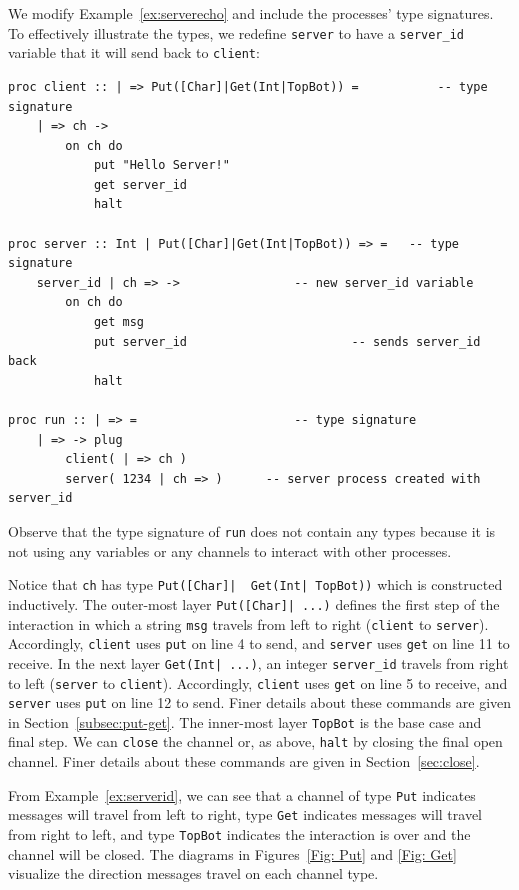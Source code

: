 \documentclass[11pt]{article}
\begin{document}
We modify Example~\ref{ex:serverecho} and include the processes' type signatures.
To effectively illustrate the types, we redefine \lstinline$server$ to have a \lstinline$server_id$ variable that it will send back to  \lstinline$client$:

\begin{lstlisting}[label=ex:serverid, caption=Server replies to Client with server id] 
proc client :: | => Put([Char]|Get(Int|TopBot)) = 			-- type signature
	| => ch ->
		on ch do 
			put "Hello Server!"	
			get server_id					
			halt

proc server :: Int | Put([Char]|Get(Int|TopBot)) => = 	-- type signature
	server_id | ch => ->				-- new server_id variable
		on ch do
			get msg							
			put server_id						-- sends server_id back
			halt
			
proc run :: | => = 						-- type signature
 	| => -> plug					
 		client( | => ch )		
 		server( 1234 | ch => )		-- server process created with server_id
\end{lstlisting}
Observe that the type signature of \lstinline$run$ does not contain any types because it is not using any variables or any channels to interact with other processes.

Notice that \lstinline$ch$ has type \lstinline$Put([Char]|  Get(Int| TopBot))$ which is constructed inductively. 
The outer-most layer \lstinline$Put([Char]| ...)$ defines the first step of the interaction in which a string \lstinline$msg$ travels from left to right (\lstinline$client$ to \lstinline$server$). 
Accordingly, \lstinline$client$ uses \lstinline$put$ on line 4 to send, and \lstinline$server$ uses \lstinline$get$ on line 11 to receive. 
In the next layer \lstinline$Get(Int| ...)$, an integer \lstinline$server_id$ travels from right to left (\lstinline$server$ to \lstinline$client$).
Accordingly, \lstinline$client$ uses \lstinline$get$ on line 5 to receive, and \lstinline$server$ uses \lstinline$put$ on line 12 to send.
Finer details about these commands are given in Section~\ref{subsec:put-get}. 
The inner-most layer \lstinline$TopBot$ is the base case and final step. 
We can \lstinline$close$ the channel or, as above, \lstinline$halt$ by closing the final open channel.
Finer details about these commands are given in Section~\ref{sec:close}. 

From Example~\ref{ex:serverid}, we can see that a channel of type \lstinline$Put$ indicates messages will travel from left to right, type \lstinline$Get$ indicates messages will travel from right to left, and type \lstinline$TopBot$ indicates the interaction is over and the channel will be closed.
The diagrams in Figures~\ref{Fig: Put} and \ref{Fig: Get} visualize the direction messages travel on each channel type.
\end{document}
